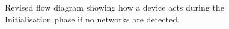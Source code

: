 \begin{figure}[p]
\centering
\footnotesize

\vspace{-15pt}
\caption{Revised flow diagram showing how a device acts during the Initialisation phase if no networks are detected.}
\label{fig:pseudo_flowMultiStart}
\vspace{-10pt}    
\end{figure}

